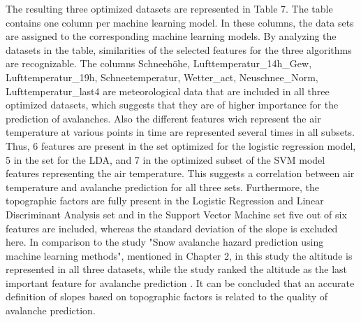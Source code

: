 \documentclass[../masterarbeit.tex]{subfiles}
\begin{document}
The resulting three optimized datasets are represented in Table 7. The table contains one column per machine learning model. In these columns, the data sets are assigned to the corresponding machine learning models. By analyzing the datasets in the table, similarities of the selected features for the three algorithms are recognizable. The columns Schneehöhe, Lufttemperatur\_14h\_Gew, Lufttemperatur\_19h, Schneetemperatur, Wetter\_act, Neuschnee\_Norm, Lufttemperatur\_last4 are meteorological data that are included in all three optimized datasets, which suggests that they are of higher importance for the prediction of avalanches. Also the different features wich represent the air temperature at various points in time are represented several times in all subsets. Thus, 6 features are present in the set optimized for the logistic regression model, 5 in the set for the LDA, and 7 in the optimized subset of the SVM model features representing the air temperature. This suggests a correlation between air temperature and avalanche prediction for all three sets. 
Furthermore, the topographic factors are fully present in the Logistic Regression and Linear Discriminant Analysis set and in the Support Vector Machine set five out of six features are included, whereas the standard deviation of the slope is excluded here. 
In comparison to the study "Snow avalanche hazard prediction using machine learning methods", mentioned in Chapter 2, in this study the altitude is represented in all three datasets, while the study ranked the altitude as the last important feature for avalanche prediction \textcite[]{Bahram:2019}.
It can be concluded that an accurate definition of slopes based on topographic factors is related to the quality of avalanche prediction.
\end{document}
